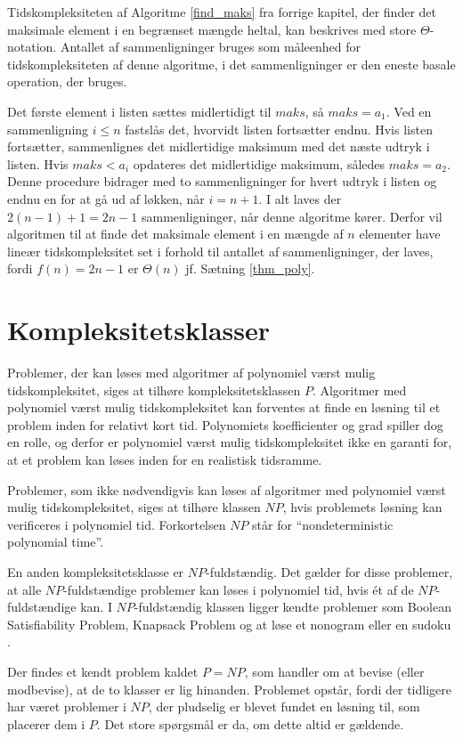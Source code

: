 \begin{exmp}
Tidskompleksiteten af Algoritme \ref{find_maks} fra forrige kapitel, der finder det maksimale element i en begrænset mængde heltal, kan beskrives med store $\Theta$-notation. 
Antallet af sammenligninger bruges som måleenhed for tidskompleksiteten af denne algoritme, i det sammenligninger er den eneste basale operation, der bruges.

Det første element i listen sættes midlertidigt til $maks$, så $maks=a_1$. 
Ved en sammenligning $i \leq n$ fastslås det, hvorvidt listen fortsætter endnu. Hvis listen fortsætter, sammenlignes det midlertidige maksimum med det næste udtryk i listen. 
Hvis $maks<a_i$ opdateres det midlertidige maksimum, således $maks=a_2$.
Denne procedure bidrager med to sammenligninger for hvert udtryk i listen og endnu en for at gå ud af løkken, når $i=n+1$. 
I alt laves der $2(n-1)+1=2n-1$ sammenligninger, når denne algoritme kører. 
Derfor vil algoritmen til at finde det maksimale element i en mængde af $n$ elementer have lineær tidskompleksitet set i forhold til antallet af sammenligninger, der laves, fordi $f(n)=2n-1$ er $\Theta (n)$ jf. Sætning \ref{thm_poly}. 
\label{eks_lin_soeg} 
\end{exmp}

\section{Kompleksitetsklasser}
Problemer, der kan løses med algoritmer af polynomiel værst mulig tidskompleksitet, siges at tilhøre kompleksitetsklassen $P$. 
Algoritmer med polynomiel værst mulig tidskompleksitet kan forventes at finde en løsning til et problem inden for relativt kort tid. 
Polynomiets koefficienter og grad spiller dog en rolle, og derfor er polynomiel værst mulig tidskompleksitet ikke en garanti for, at et problem kan løses inden for en realistisk tidsramme.

Problemer, som ikke nødvendigvis kan løses af algoritmer med  polynomiel værst mulig tidskompleksitet, siges at tilhøre klassen $NP$, hvis problemets løsning kan verificeres i polynomiel tid. Forkortelsen $NP$ står for “nondeterministic polynomial time”. 

En anden kompleksitetsklasse er $NP$-fuldstændig.
Det gælder for disse problemer, at alle $NP$-fuldstændige problemer kan løses i polynomiel tid, hvis ét af de $NP$-fuldstændige kan.
I $NP$-fuldstændig klassen ligger kendte problemer som Boolean Satisfiability Problem, Knapsack Problem og at løse et nonogram \citep{computers} eller en sudoku \citep{sudoku}.

Der findes et kendt problem kaldet $P=NP$, som handler om at bevise (eller modbevise), at de to klasser er lig hinanden.
Problemet opstår, fordi der tidligere har været problemer i $NP$, der pludselig er blevet fundet en løsning til, som placerer dem i $P$.
Det store spørgsmål er da, om dette altid er gældende.

